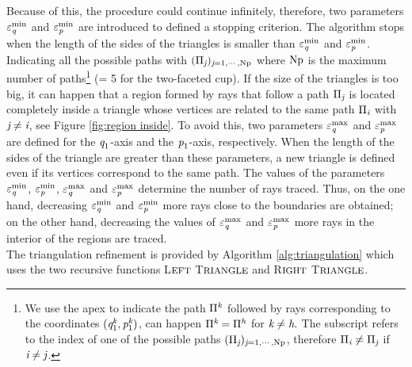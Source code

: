 Because of this, the procedure could continue infinitely, therefore, two parameters $\varepsilon_{\textit{q}}^\textrm{min}$ and $\varepsilon_{\textit{p}}^\textrm{min}$ are introduced to defined a stopping criterion.
The algorithm stops when the length of the sides of the triangles is smaller than $\varepsilon_{\textit{q}}^\textrm{min}$ and $\varepsilon_{\textit{p}}^\textrm{min}$.
Indicating all the possible paths with $(\Pi_{\textit{j}})_{\textit{j}=1, \cdots, \textrm{Np}}$ where $\textrm{Np}$ is the maximum number of paths\footnote{We use the apex to indicate the path $\Pi^{\textit{k}}$ followed by rays corresponding to the coordinates $(\textit{q}_1^{\textit{k}},\textit{p}_1^{\textit{k}})$, 
can happen $\Pi^{\textit{k}}= \Pi^{\textit{h}}$ for $\textit{k}\neq\textit{h}.$
The subscript refers to the index of one of the possible paths $(\Pi_{\textit{j}})_{\textit{j}=1, \cdots, \textrm{Np}}$, therefore $\Pi_{\textit{i}}\neq\Pi_{\textit{j}}$ if $\textit{i}\neq\textit{j}$.} (\npath = 5 for the two-faceted cup).
If the size of the triangles is too big, it can happen that a region formed by rays that follow a path $\Pi_{\textit{j}}$ is located completely inside a triangle whose vertices are related to the same path $\Pi_{\textit{i}}$ with $\textit{j} \neq  \textit{i}$, see Figure \ref{fig:region inside}.
To avoid this, two parameters $\varepsilon_{\textit{q}}^{\textrm{max}}$ and $\varepsilon_{\textit{p}}^{\textrm{max}}$ are defined for the $\textit{q}_1$-axis and the $\textit{p}_1$-axis, respectively.
When the length of the sides of the triangle are greater than these parameters, a new triangle is defined even if its vertices correspond to the same path.
The values of the parameters $\varepsilon_{\textit{q}}^\textrm{min}$, $\varepsilon_{\textit{p}}^\textrm{min}$, $\varepsilon_{\textit{q}}^\textrm{max}$ and $\varepsilon_{\textit{p}}^\textrm{max}$ determine the number of rays traced.
Thus, on the one hand, decreasing $\varepsilon_{\textit{q}}^\textrm{min}$ and $\varepsilon_{\textit{p}}^\textrm{min}$ more rays close to the boundaries are obtained;
on the other hand, decreasing the values of $\varepsilon_{\textit{q}}^\textrm{max}$ and $\varepsilon_{\textit{p}}^\textrm{max}$ more rays in the interior of the regions are traced. \\ \indent The triangulation refinement is provided by Algorithm \ref{alg:triangulation} which uses the two recursive functions L$\footnotesize{\textrm{EFT}}$ T$\footnotesize{\textrm{RIANGLE}}$ and  R$\footnotesize{\textrm{IGHT}}$ T$\footnotesize{\textrm{RIANGLE}}$.
